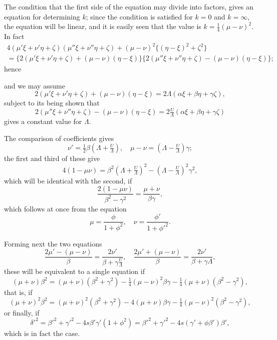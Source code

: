 \documentclass[11pt]{article}
\begin{document}
The condition that the first side of the equation may divide into factors, gives an equation for determining $k$; since the condition is satisfied for $k=0$ and $k=\infty$, the equation will be linear, and it is easily seen that the value is $k=\tfrac{1}{4}(\mu-\nu)^2$. In fact
\begin{multline*}
4(\mu'\xi+\nu'\eta+\zeta)(\mu''\xi+\nu''\eta+\zeta) + (\mu-\nu)^2\{(\eta-\xi)^2+\zeta^2\}\\
= \{2(\mu'\xi+\nu'\eta+\zeta)+(\mu-\nu)(\eta-\xi)\}\{2(\mu''\xi+\nu''\eta+\zeta)-(\mu-\nu)(\eta-\xi)\};
\end{multline*}
hence

\newpage
\setcounter{page}{71}

and we may assume
\[
2(\mu'\xi+\nu'\eta+\zeta)+(\mu-\nu)(\eta-\xi) = 2\Lambda(\alpha\xi+\beta\eta+\gamma\zeta),
\]
subject to its being shown that
\[
2(\mu''\xi+\nu''\eta+\zeta)-(\mu-\nu)(\eta-\xi) = 2\tfrac{U}{\Lambda}(\alpha\xi+\beta\eta+\gamma\zeta)
\]
gives a constant value for $\Lambda$.

The comparison of coefficients gives
\[
\nu' = \tfrac{1}{2}\beta(\Lambda+\tfrac{U}{\Lambda}), \quad \mu-\nu = (\Lambda-\tfrac{U}{\Lambda})\gamma;
\]
the first and third of these give
\[
4(1-\mu\nu) = \beta^2(\Lambda+\tfrac{U}{\Lambda})^2 - (\Lambda-\tfrac{U}{\Lambda})^2\gamma^2,
\]
which will be identical with the second, if
\[
\frac{2(1-\mu\nu)}{\beta^2-\gamma^2} = \frac{\mu+\nu}{\beta\gamma},
\]
which follows at once from the equation
\[
\mu = \frac{\phi}{1+\phi^2}, \quad \nu = \frac{\phi'}{1+\phi'^2}.
\]

Forming next the two equations
\[
\frac{2\mu'- (\mu-\nu)}{\beta} = \frac{2\nu'}{\beta+\gamma\tfrac{U}{\Lambda}}, \quad \frac{2\mu'+ (\mu-\nu)}{\beta} = \frac{2\nu'}{\beta+\gamma\Lambda},
\]
these will be equivalent to a single equation if
\[
(\mu+\nu)\beta^2 = (\mu+\nu)(\beta^2+\gamma^2) - \tfrac{1}{4}(\mu-\nu)^2\beta\gamma - \tfrac{1}{4}(\mu+\nu)(\beta^2-\gamma^2),
\]
that is, if
\[
(\mu+\nu)^2\beta^2 = (\mu+\nu)^2(\beta^2+\gamma^2) - 4(\mu+\nu)\beta\gamma - \tfrac{1}{4}(\mu-\nu)^2(\beta^2-\gamma^2),
\]
or finally, if
\[
\delta'^2 = \beta'^2+\gamma'^2-4s\beta'\gamma'(1+\phi^2) = \beta'^2+\gamma'^2-4s(\gamma'+\phi\beta')\beta',
\]
which is in fact the case.

\newpage
\setcounter{page}{72}
\end{document}
